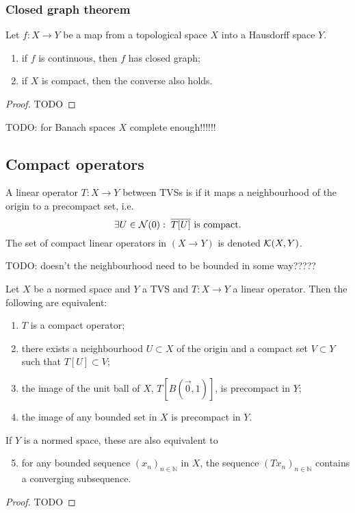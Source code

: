 \subsubsection{Closed graph theorem}

\begin{theorem} \label{closedGraphTheorem}
Let $f:X\to Y$ be a map from a topological space $X$ into a Hausdorff space $Y$.
\begin{enumerate}
\item if $f$ is continuous, then $f$ has closed graph;
\item if $X$ is compact, then the converse also holds.
\end{enumerate}
\end{theorem}
\begin{proof}
TODO
\end{proof}
TODO: for Banach spaces $X$ complete enough!!!!!!


\subsection{Compact operators}
\begin{definition}
A linear operator $T:X\to Y$ between TVSs is  if it maps a neighbourhood of the origin to a precompact set, i.e.\ 
\[ \exists U \in \operatorname{\mathcal{N}}(0): \;  \text{$\overline{T[U]}$ is compact.} \]
The set of compact linear operators in $(X\to Y)$ is denoted $\operatorname{\mathcal{K}}(X,Y)$.
\end{definition}
TODO: doesn't the neighbourhood need to be bounded in some way?????

\begin{proposition}
Let $X$ be a normed space and $Y$ a TVS and $T:X\to Y$ a linear operator. Then the following are equivalent:
\begin{enumerate}
\item $T$ is a compact operator;
\item there exists a neighbourhood $U \subset X$ of the origin and a compact set $V\subset Y$ such that $T[U] \subset V$;
\item the image of the unit ball of $X$, $T[B(\vec{0},1)]$, is precompact in $Y$;
\item the image of any bounded set in $X$ is precompact in $Y$.
\end{enumerate}
If $Y$ is a normed space, these are also equivalent to
\begin{enumerate} \setcounter{enumi}{4}
\item for any bounded sequence $(x_{n})_{n\in \mathbb{N}}$ in $X$, the sequence $(Tx_{n})_{n\in \mathbb{N} }$ contains a converging subsequence.
\end{enumerate}
\end{proposition}
\begin{proof}
TODO
\end{proof}


